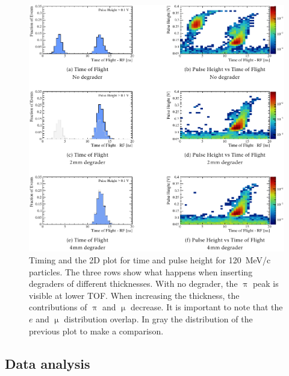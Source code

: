 \begin{refsection}
        \begin{figure}
            \centering
            \includegraphics[width=\textwidth]{Figures/muEDM_Dec2021/muEDM_beamtime2021_TOF.png}
            \caption[muEDM 2021: beamstudies with degrades]{Timing and the 2D plot for time and pulse height for \SI{120}{MeV/c} particles. The three rows show what happens when inserting degraders of different thicknesses.
            With no degrader, the $\uppi$ peak is visible at lower TOF.
            When increasing the thickness, the contributions of $\uppi$ and $\upmu$ decrease.
            It is important to note that the $e$ and $\upmu$ distribution overlap.
            In gray the distribution of the previous plot to make a comparison.}
            \label{fig:muEDM:bt2021:TOF}
        \end{figure}

    \subsection{Data analysis}

\end{refsection}
